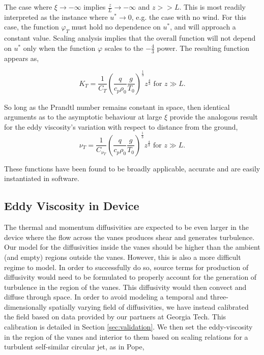 The case where $\xi \to -\infty $ implies $\frac{z}{L} \to
-\infty $ and $z>>L$. This is most readily interpreted as the instance
where $u^* \to 0$, e.g. the case with no wind. For this case, the
function $\varphi_T$ must hold no dependence on $u^*$, and will approach
a constant value. Scaling analysis implies that the overall function
will not depend on $u^*$ only when the function $\varphi$ scales to the
$-\frac{4}{3}$ power. The resulting function appears as, 

\begin{equation}
 K_T = \frac{1}{C_T} \left( \frac{q}{c_p \rho_0} \frac{g}{T_0}
		     \right)^\frac{1}{3} z^{\frac{4}{3}}  \text{ 
for } z \gg L. 
\end{equation}

So long as the Prandtl number remains constant in space, then
identical arguments as to the asymptotic behaviour at large $\xi$ provide
the analogous result for the eddy viscosity's variation with respect to
distance from the ground,  
\begin{equation}
 \nu_T = \frac{1}{C_{\nu_T}} \left( \frac{q}{c_p \rho_0} \frac{g}{T_0}
			     \right)^\frac{1}{3} z^{\frac{4}{3}}  \text{ 
for } z \gg L. 
\end{equation}

These functions have been found to be broadly applicable, accurate and 
are easily instantiated in software. 

\subsection{Eddy Viscosity in Device}

The thermal and momentum diffusivities are expected to be even larger in the
device where the flow across the vanes produces shear and generates
turbulence. Our model for  
the diffusivities inside the vanes should be higher than the ambient
(and empty) regions outside the vanes. However, this is also a more
difficult regime to model. In order to successfully do so, source terms
for production of diffusivity would need to be formulated to properly
account for the generation of turbulence in the region of the
vanes. This diffusivity would then convect and diffuse through space. In
order to avoid modeling a temporal and three-dimensionally spatially
varying field of diffusivities, we have instead calibrated the field
based on data provided by our partners at Georgia Tech. This calibration
is detailed in Section \ref{sec:validation}. We then set the eddy-viscosity in
the region of the vanes and interior to them based on scaling relations
for a turbulent self-similar circular jet, as in
Pope\cite{pope2000turbulent},
 
